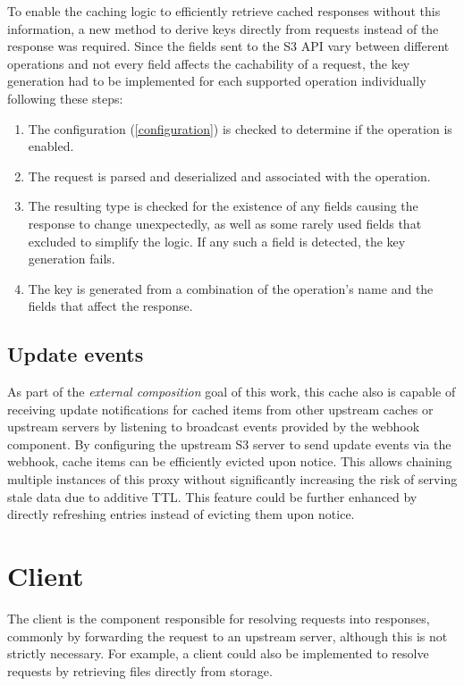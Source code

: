To enable the caching logic to efficiently retrieve cached responses without this information, a new method to derive keys directly from requests instead of the response was required. Since the fields sent to the S3 API vary between different operations and not every field affects the cachability of a request, the key generation had to be implemented for each supported operation individually following these steps:
\begin{enumerate}
	\item The configuration (\ref{configuration}) is checked to determine if the operation is enabled.
	\item The request is parsed and deserialized and associated with the operation.
	\item The resulting type is checked for the existence of any fields causing the response to change unexpectedly, as well as some rarely used fields that excluded to simplify the logic. If any such a field is detected, the key generation fails.
	\item The key is generated from a combination of the operation's name and the fields that affect the response.
\end{enumerate}

\subsection{Update events}
\label{cache:event}
As part of the \textit{external composition} goal of this work, this cache also is capable of receiving update notifications for cached items from other upstream caches or upstream servers by listening to broadcast events provided by the webhook component. By configuring the upstream S3 server to send update events via the webhook, cache items can be efficiently evicted upon notice. This allows chaining multiple instances of this proxy without significantly increasing the risk of serving stale data due to additive TTL.
This feature could be further enhanced by directly refreshing entries instead of evicting them upon notice.

\section{Client}

The client is the component responsible for resolving requests into responses, commonly by forwarding the request to an upstream server, although this is not strictly necessary. For example, a client could also be implemented to resolve requests by retrieving files directly from storage.

